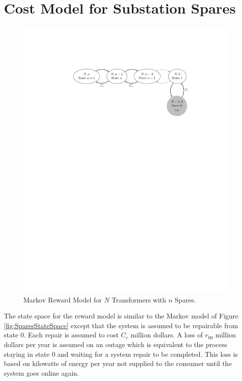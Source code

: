 \documentclass[letterpaper, 12pt]{article}
\begin{document}
\section{Cost Model for Substation Spares}
\label{sec:SparesMarkovRewardModel}
\begin{figure}[h!] \centering
  \includegraphics[scale=0.9]{RewardStateSpace}
  \caption{Markov Reward Model for $N$ Transformers with $n$ Spares.\label{fig:RewardStateSpace}} 
\end{figure}
The state space for the reward model is similar to the Markov model of Figure \ref{fig:SparesStateSpace} except that the system is assumed to be repairable from state 0. Each repair is assumed to cost $C_r$ million dollars. A loss of $r_{00}$ million dollars per year is assumed on an outage which is equivalent to the process staying in state 0 and waiting for a system repair to be completed. This loss is based on kilowatts of energy per year not supplied to the consumer until the system goes online again.
\end{document}
